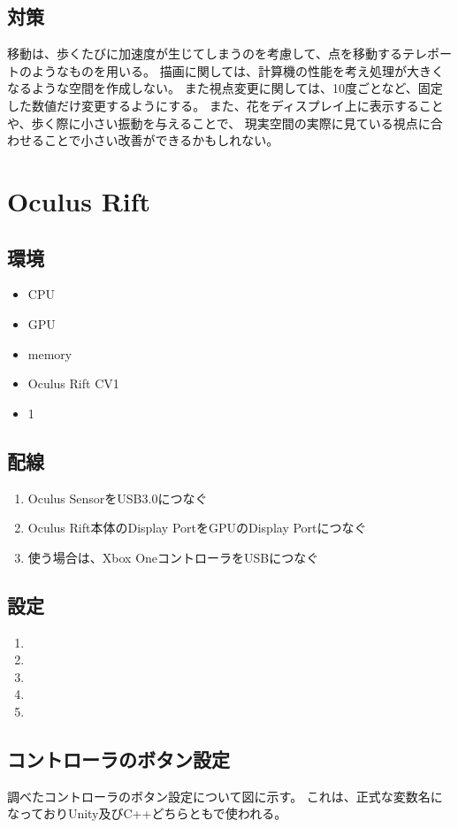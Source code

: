 \documentclass{jsarticle}
\begin{document}
\subsection{対策}
移動は、歩くたびに加速度が生じてしまうのを考慮して、点を移動するテレポートのようなものを用いる。
描画に関しては、計算機の性能を考え処理が大きくなるような空間を作成しない。
また視点変更に関しては、10度ごとなど、固定した数値だけ変更するようにする。
また、花をディスプレイ上に表示することや、歩く際に小さい振動を与えることで、
現実空間の実際に見ている視点に合わせることで小さい改善ができるかもしれない。


\section{Oculus Rift}
\subsection{環境}
\begin{itemize}
  \item CPU
  \item GPU
  \item memory
  \item Oculus Rift CV1
  \item 1
\end{itemize}

\subsection{配線}
\begin{enumerate}
  \item Oculus SensorをUSB3.0につなぐ
  \item Oculus Rift本体のDisplay PortをGPUのDisplay Portにつなぐ
  \item 使う場合は、Xbox OneコントローラをUSBにつなぐ
\end{enumerate}

\subsection{設定}
\begin{enumerate}
  \item
  \item
  \item
  \item
  \item
\end{enumerate}

\subsection{コントローラのボタン設定}
調べたコントローラのボタン設定について図に示す。
これは、正式な変数名になっておりUnity及びC++どちらともで使われる。
\end{document}
